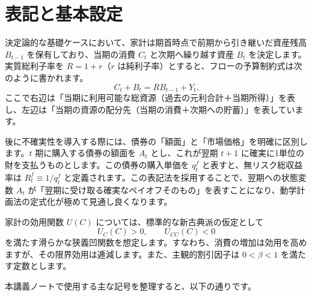 \documentclass[
  japanese,
  lualatex,
  ja=standard,
  12pt,
  a4paper]{ltjsarticle}
\begin{document}
\section{表記と基本設定}\label{ux8868ux8a18ux3068ux57faux672cux8a2dux5b9a}

決定論的な基礎ケースにおいて、家計は期首時点で前期から引き継いだ資産残高
\(B_{t-1}\) を保有しており、当期の消費 \(C_t\) と次期へ繰り越す資産
\(B_t\) を決定します。実質総利子率を \(R = 1+r\)（\(r\)
は純利子率）とすると、フローの予算制約式は次のように書かれます。 \[
C_t + B_t = R B_{t-1} + Y_t.
\]
ここで右辺は「当期に利用可能な総資源（過去の元利合計＋当期所得）」を表し、左辺は「当期の資源の配分先（当期の消費＋次期への貯蓄）」を表しています。

後に不確実性を導入する際には、債券の「額面」と「市場価格」を明確に区別します。\(t\)
期に購入する債券の額面を \(A_t\) とし、これが翌期 \(t+1\)
に確実に1単位の財を支払うものとします。この債券の購入単価を \(q_t^f\)
と表すと、無リスク総収益率は \(R_t^f \equiv 1/q_t^f\)
と定義されます。この表記法を採用することで、翌期への状態変数 \(A_t\)
が「翌期に受け取る確実なペイオフそのもの」を表すことになり、動学計画法の定式化が極めて見通し良くなります。

家計の効用関数 \(U(C)\) については、標準的な新古典派の仮定として \[
U_C(C) > 0, \qquad U_{CC}(C) < 0
\]
を満たす滑らかな狭義凹関数を想定します。すなわち、消費の増加は効用を高めますが、その限界効用は逓減します。また、主観的割引因子は
\(0 < \beta < 1\) を満たす定数とします。

本講義ノートで使用する主な記号を整理すると、以下の通りです。
\end{document}
